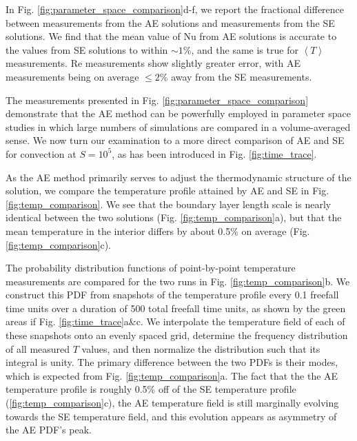 \documentclass[aps, pre, onecolumn, nofootinbib, notitlepage, groupedaddress, amsfonts, amssymb, amsmath, longbibliography]{revtex4-1}
\newcommand{\angles}[1]{\ensuremath{\left\langle #1 \right\rangle}}
\begin{document}
In Fig. \ref{fig:parameter_space_comparison}d-f, we report the fractional difference
between measurements from the AE solutions and measurements from the SE solutions.
We find that the mean value of Nu from AE solutions is accurate to the values
from SE solutions to within $\sim 1$\%, and the same is true for $\angles{T}$ measurements.
Re measurements show slightly greater error, with AE measurements being on average
$\leq 2$\% away from the SE measurements. 

The measurements presented in Fig. \ref{fig:parameter_space_comparison} demonstrate
that the AE method can be powerfully employed in parameter space studies in which
large numbers of simulations are compared in a volume-averaged sense.  We now turn
our examination to a more direct comparison of AE and SE for convection at
$S = 10^5$, as has been introduced in Fig. \ref{fig:time_trace}.

As the AE method primarily serves to adjust the thermodynamic structure of the
solution, we compare the temperature profile attained by AE and SE in 
Fig. \ref{fig:temp_comparison}.  We see that the boundary layer length scale is 
nearly identical between the two solutions (Fig. \ref{fig:temp_comparison}a), but that
the mean temperature in the interior differs by about 0.5\% on average
(Fig. \ref{fig:temp_comparison}c). 

The probability distribution functions 
of point-by-point temperature measurements are compared for the two runs
in Fig. \ref{fig:temp_comparison}b.  We construct
this PDF from snapshots of the temperature profile every 0.1 freefall time
units over a duration of 500 total freefall time units, as shown by the green
areas if Fig. \ref{fig:time_trace}a\&c.  We interpolate the temperature field
of each of these snapshots onto an evenly spaced grid, determine the
frequency distribution of all measured $T$ values, and then normalize the
distribution such that its integral is unity.  The primary difference between
the two PDFs is their modes, which is expected from Fig. \ref{fig:temp_comparison}a. 
The fact that the the AE temperature
profile is roughly 0.5\% off of the SE temperature profile (\ref{fig:temp_comparison}c), 
the AE temperature
field is still marginally evolving towards the SE temperature field, and this
evolution appears as asymmetry of the AE PDF's peak.
\end{document}
